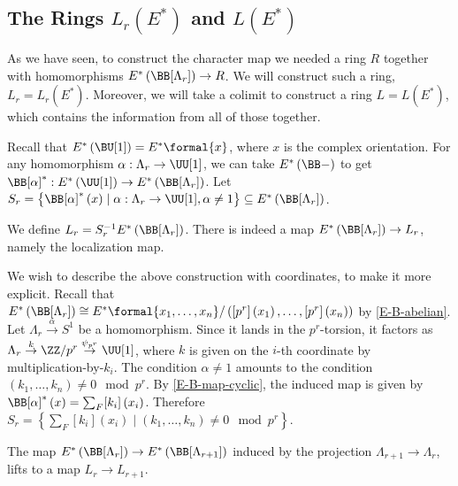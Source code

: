 \subsection{The Rings \texorpdfstring{$L_r\left(E^*\right)$}{Lr(E*)} and \texorpdfstring{$L\left(E^*\right)$}{L(E*)}}

As we have seen, to construct the character map we needed a ring $R$ together with homomorphisms $E^*\left(\BB[\Lambda_r]\right) \to R$.
We will construct such a ring, $L_r = L_r\left(E^*\right)$.
Moreover, we will take a colimit to construct a ring $L = L\left(E^*\right)$, which contains the information from all of those together.

Recall that $E^*\left(\BU[1]\right) = E^*\formal{x}$, where $x$ is the complex orientation.
For any homomorphism $\alpha: \Lambda_r \to \UU[1]$, we can take $E^*\left(\BB-\right)$ to get $\BB[\alpha]^*: E^*\left(\UU[1]\right) \to E^*\left(\BB[\Lambda_r]\right)$.
Let $S_r = \left\{ \BB[\alpha]^*\left(x\right) \mid \alpha: \Lambda_r \to \UU[1], \alpha \neq 1 \right\} \subseteq E^*\left(\BB[\Lambda_r]\right)$.

\begin{definition}\label{Lr}
	We define $L_r = S_r^{-1} E^*\left(\BB[\Lambda_r]\right)$.
	There is indeed a map $E^*\left(\BB[\Lambda_r]\right) \to L_r$, namely the localization map.
\end{definition}

We wish to describe the above construction with coordinates, to make it more explicit.
Recall that $E^*\left(\BB[\Lambda_r]\right) \cong E^*\formal{x_1, \dotsc, x_n}/\left(\left[p^r\right]\left(x_1\right), \dotsc, \left[p^r\right]\left(x_n\right)\right)$ by \ref{E-B-abelian}.
Let $\Lambda_r \overset{\alpha}{\to} S^1$ be a homomorphism.
Since it lands in the $p^r$-torsion, it factors as $\Lambda_r \overset{k}{\to} \ZZ/{p^r} \overset{\psi_{p^r}}{\to} \UU[1]$, where $k$ is given on the $i$-th coordinate by multiplication-by-$k_i$.
The condition $\alpha \neq 1$ amounts to the condition $\left(k_1, \dotsc, k_n\right) \neq 0 \mod p^r$.
By \ref{E-B-map-cyclic}, the induced map is given by $\BB[\alpha]^*\left(x\right) = \sum_F [k_i]\left(x_i\right)$.
Therefore $S_r = \left\{ \sum_F [k_i]\left(x_i\right) \mid \left(k_1, \dotsc, k_n\right) \neq 0 \mod p^r\right\}$.

\begin{proposition}
	The map $E^*\left(\BB[\Lambda_r]\right) \to E^*\left(\BB[\Lambda_{r+1}]\right)$ induced by the projection $\Lambda_{r+1} \to \Lambda_r$, lifts to a map $L_r \to L_{r+1}$.
\end{proposition}

